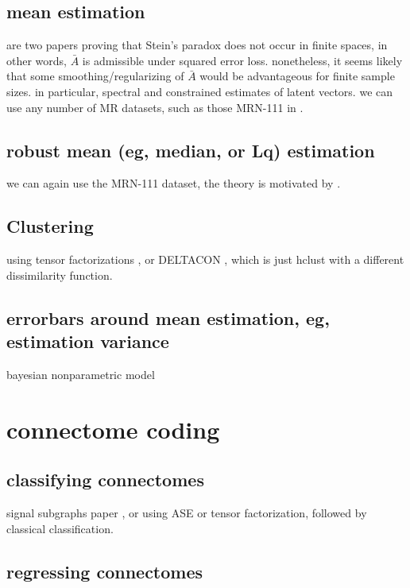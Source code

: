 \documentclass[final,leqno]{article}
\begin{document}
\subsection{mean estimation}

\cite{Johnson71a,Gutmann82a} are two papers proving that Stein's paradox does not occur in finite spaces, in other words, $\bar{A}$ is admissible under squared error loss.  nonetheless, it seems likely that some smoothing/regularizing of $\bar{A}$ would be advantageous for finite sample sizes.  in particular, spectral and constrained estimates of latent vectors.  we can use any number of MR datasets, such as those MRN-111 in \cite{MIGRAINE}.


\subsection{robust mean (eg, median, or Lq) estimation}

we can again use the MRN-111 dataset, the theory is motivated by \cite{Ferrari2010a,Qin2013a}.


\subsection{Clustering}

using tensor factorizations \cite{Lee13a,Lee14a,Lee14b}, or DELTACON \cite{Koutra2013,Koutra2014}, which is just hclust with a different dissimilarity function.

\subsection{errorbars around mean estimation, eg, estimation variance}
 
bayesian nonparametric model \cite{Durante14a}


\section{connectome coding}


\subsection{classifying connectomes}

signal subgraphs paper \cite{signal-subgraph}, or using ASE or tensor factorization, followed by classical classification.

\subsection{regressing connectomes}
\end{document}
